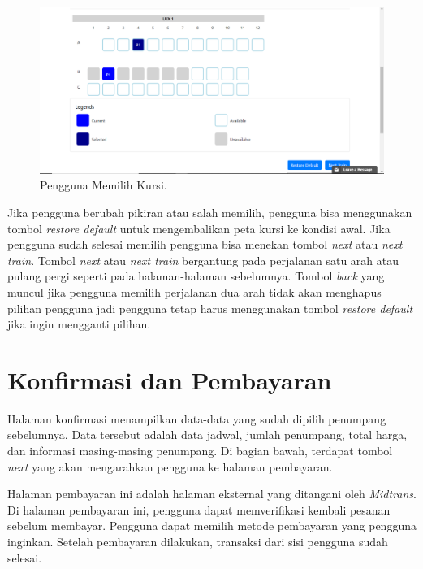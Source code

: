 \begin{figure}[H]
        \center
        \includegraphics[width=\textwidth,height=\textheight,keepaspectratio]{Gambar/Seat selected.png}
        \caption{Pengguna Memilih Kursi.}
            \label{img:penggunapilihkursi}
        \end{figure}


Jika pengguna berubah pikiran atau salah memilih, pengguna bisa menggunakan tombol \textit{restore default} untuk mengembalikan peta kursi ke kondisi awal. Jika pengguna sudah selesai memilih pengguna bisa menekan tombol \textit{next} atau \textit{next train}. Tombol \textit{next} atau \textit{next train} bergantung pada perjalanan satu arah atau pulang pergi seperti pada halaman-halaman sebelumnya. Tombol \textit{back} yang muncul jika pengguna memilih perjalanan dua arah tidak akan menghapus pilihan pengguna jadi pengguna tetap harus menggunakan tombol \textit{restore default} jika ingin mengganti pilihan.

\section{Konfirmasi dan Pembayaran}
\label{sec:konfirmasidanpembayaran}

Halaman konfirmasi menampilkan data-data yang sudah dipilih penumpang sebelumnya. Data tersebut adalah data jadwal, jumlah penumpang, total harga, dan informasi masing-masing penumpang. Di bagian bawah, terdapat tombol \textit{next} yang akan mengarahkan pengguna ke halaman pembayaran.

Halaman pembayaran ini adalah halaman eksternal yang ditangani oleh \textit{Midtrans}. Di halaman pembayaran ini, pengguna dapat memverifikasi kembali pesanan sebelum membayar. Pengguna dapat memilih metode pembayaran yang pengguna inginkan. Setelah pembayaran dilakukan, transaksi dari sisi pengguna sudah selesai.

